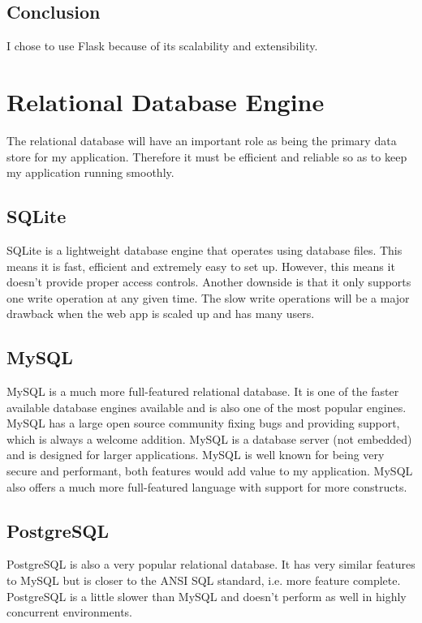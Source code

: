 \documentclass[a4paper,oneside,12pt,draft]{report}
\begin{document}
	\subsection{Conclusion}
	I chose to use Flask because of its scalability and extensibility. 

	\section{Relational Database Engine}
	The relational database will have an important role as being the primary data store for my application. Therefore it must be efficient and reliable so as to keep my application running smoothly.

	\subsection{SQLite}
	SQLite is a lightweight database engine that operates using database files. This means it is fast, efficient and extremely easy to set up. However, this means it doesn’t provide proper access controls. Another downside is that it only supports one write operation at any given time. The slow write operations will be a major drawback when the web app is scaled up and has many users.

	\subsection{MySQL}
	MySQL is a much more full-featured relational database. It is one of the faster available database engines available and is also one of the most popular engines. MySQL has a large open source community fixing bugs and providing support, which is always a welcome addition. MySQL is a database server (not embedded) and is designed for larger applications. MySQL is well known for being very secure and performant, both features would add value to my application. MySQL also offers a much more full-featured language with support for more constructs.

	\subsection{PostgreSQL}
	PostgreSQL is also a very popular relational database. It has very similar features to MySQL but is closer to the ANSI SQL standard, i.e. more feature complete. PostgreSQL is a little slower than MySQL and doesn’t perform as well in highly concurrent environments.
	
\end{document}

